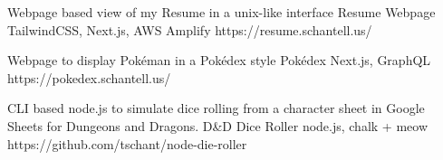 \begin{cventries}
	\cventry
	{Webpage based view of my Resume in a unix-like interface}
	{Resume Webpage}
	{TailwindCSS, Next.js, AWS Amplify}
	{https://resume.schantell.us/}
	{}
	
	\vspace{-5mm}
	\cventry
	{Webpage to display Pokéman in a Pokédex style}
	{Pokédex}
	{Next.js, GraphQL}
	{https://pokedex.schantell.us/}
	{}
	
	\vspace{-5mm}
	\cventry
	{CLI based node.js to simulate dice rolling from a character sheet in Google Sheets for Dungeons and Dragons.}
	{D\&D Dice Roller}
	{node.js, chalk + meow}
	{https://github.com/tschant/node-die-roller}
	{}
	
	\vspace{-5mm}
\end{cventries}

